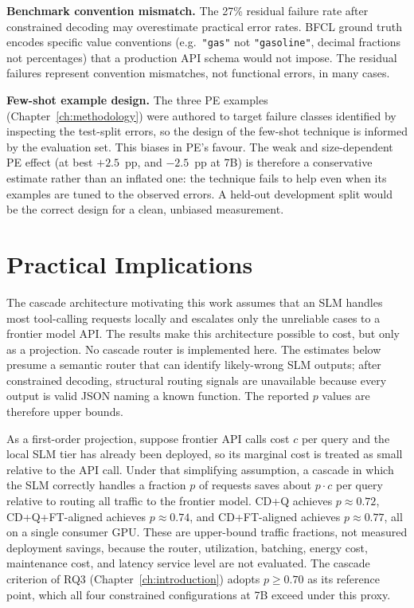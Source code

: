 \textbf{Benchmark convention mismatch.}
The 27\% residual failure rate after constrained decoding may
overestimate practical error rates. BFCL ground truth encodes
specific value conventions (e.g.\ \texttt{"gas"} not
\texttt{"gasoline"}, decimal fractions not percentages) that a
production API schema would not impose. The residual failures
represent convention mismatches, not functional errors, in many cases.

\textbf{Few-shot example design.}
The three PE examples (Chapter~\ref{ch:methodology}) were authored to target
failure classes identified by inspecting the test-split errors, so the design
of the few-shot technique is informed by the evaluation set. This biases in
PE's favour. The weak and size-dependent PE effect (at best $+2.5$~pp, and
$-2.5$~pp at 7B) is therefore a conservative estimate rather than an inflated
one: the technique fails to help even when its examples are tuned to the
observed errors. A held-out development split would be the correct design for
a clean, unbiased measurement.

\section{Practical Implications} \label{sec:practical-implications}

The cascade architecture motivating this work assumes that an SLM handles
most tool-calling requests locally and escalates only the unreliable cases to
a frontier model API. The results make this architecture possible to cost, but
only as a projection. No cascade router is implemented here. The estimates
below presume a semantic router that can identify likely-wrong SLM outputs;
after constrained decoding, structural routing signals are unavailable because
every output is valid JSON naming a known function. The reported $p$ values
are therefore upper bounds.

As a first-order projection, suppose frontier API calls cost $c$ per query and
the local SLM tier has already been deployed, so its marginal cost is treated
as small relative to the API call. Under that simplifying assumption, a cascade
in which the SLM correctly handles a fraction $p$ of requests saves about
$p \cdot c$ per query relative to routing all traffic to the frontier model.
CD+Q achieves $p \approx 0.72$, CD+Q+FT-aligned achieves $p \approx 0.74$, and
CD+FT-aligned achieves $p \approx 0.77$, all on a single consumer GPU\@. These
are upper-bound traffic fractions, not measured deployment savings, because
the router, utilization, batching, energy cost, maintenance cost, and latency
service level are not evaluated. The cascade criterion of RQ3
(Chapter~\ref{ch:introduction}) adopts $p \geq 0.70$ as its reference point,
which all four constrained configurations at 7B exceed under this proxy.


